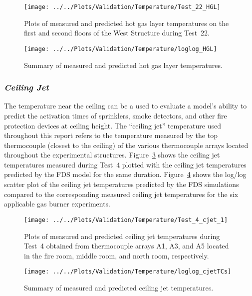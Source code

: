 \begin{figure}[!h]
	\centering
	\texttt{[image: ../../Plots/Validation/Temperature/Test\_22\_HGL]}
	\caption[Plots of measured and predicted hot gas layer temperatures during Test~22.]{Plots of measured and predicted hot gas layer temperatures on the first and second floors of the West Structure during Test~22.}
	\label{fig:HGL_data}
\end{figure}

\begin{figure}[!h]
	\centering
	\texttt{[image: ../../Plots/Validation/Temperature/loglog\_HGL]}
	\caption{Summary of measured and predicted hot gas layer temperatures.}
	\label{fig:loglog_HGL}
\end{figure}

\FloatBarrier
\subsubsection*{\textit{Ceiling Jet}}
The temperature near the ceiling can be a used to evaluate a model's ability to predict the activation times of sprinklers, smoke detectors, and other fire protection devices at ceiling height. The ``ceiling jet'' temperature used throughout this report refers to the temperature measured by the top thermocouple (closest to the ceiling) of the various thermocouple arrays located throughout the experimental structures. Figure~\ref{fig:cjet_data} shows the ceiling jet temperatures measured during Test~4 plotted with the ceiling jet temperatures predicted by the FDS model for the same duration. Figure~\ref{fig:loglog_cjets} shows the log/log scatter plot of the ceiling jet temperatures predicted by the FDS simulations compared to the corresponding measured ceiling jet temperatures for the six applicable gas burner experiments.
\begin{figure}[!h]
	\centering
	\texttt{[image: ../../Plots/Validation/Temperature/Test\_4\_cjet\_1]}
	\caption[Plots of measured and predicted ceiling jet temperatures during Test~4.]{Plots of measured and predicted ceiling jet temperatures during Test~4 obtained from thermocouple arrays A1, A3, and A5 located in the fire room, middle room, and north room, respectively.}
	\label{fig:cjet_data}
\end{figure}

\begin{figure}[!h]
	\centering
	\texttt{[image: ../../Plots/Validation/Temperature/loglog\_cjetTCs]}
	\caption{Summary of measured and predicted ceiling jet temperatures.}
	\label{fig:loglog_cjets}
\end{figure}

